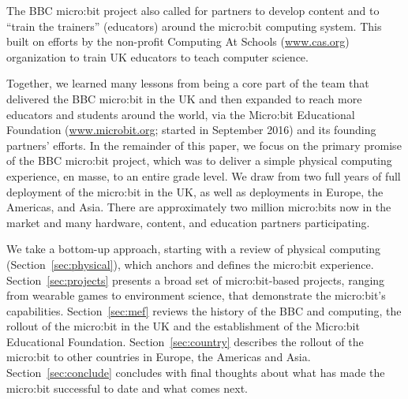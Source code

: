 The BBC micro:bit project also called for partners to develop content
and to ``train the trainers'' (educators) around the micro:bit computing
system.  This built on efforts by the non-profit Computing At Schools
(\url{www.cas.org}) organization to train UK educators to teach computer
science. 




Together, we learned many lessons from being a core part of the team that
delivered the BBC micro:bit in the UK and then expanded to reach 
more educators and students around the world, via the Micro:bit Educational
Foundation (\url{www.microbit.org}; started in September 2016) and its 
founding partners' efforts.
In the remainder of this paper, we focus on the primary promise
of the BBC micro:bit project, which was to deliver a simple physical computing
experience, en masse, to an entire grade level.  We draw from two full years of 
full deployment of the micro:bit in the UK, as well as deployments
in Europe, the Americas, and Asia.  There are approximately
two million micro:bits now in the market and many hardware,
content, and education partners participating. 

We take a bottom-up approach, starting with a review of
physical computing (Section~\ref{sec:physical}), which anchors 
and defines the micro:bit experience. Section~\ref{sec:projects}
presents a broad set of micro:bit-based projects, ranging
from wearable games to environment science, that demonstrate
the micro:bit's capabilities.  Section~\ref{sec:mef} reviews
the history of the BBC and computing, the rollout of the
micro:bit in the UK and the establishment of the Micro:bit
Educational Foundation.  Section~\ref{sec:country}
describes the rollout of the micro:bit to other countries
in Europe, the Americas and Asia. Section~\ref{sec:conclude}
concludes with final thoughts about what has made the micro:bit
successful to date and what comes next. 




